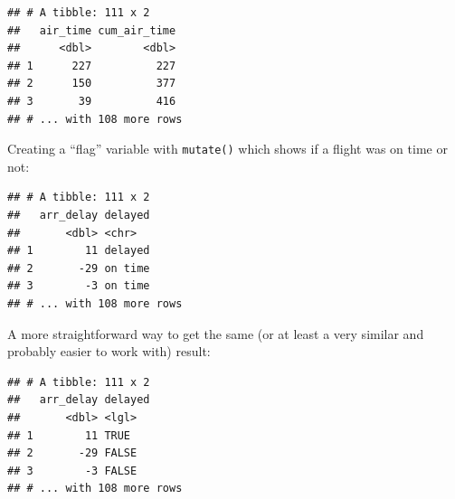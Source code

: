 \documentclass[]{book}
\newenvironment{Shaded}{}{}
\newcommand{\DataTypeTok}[1]{#1}
\newcommand{\DecValTok}[1]{#1}
\newcommand{\KeywordTok}[1]{\textcolor[rgb]{0.00,0.00,1.00}{#1}}
\newcommand{\NormalTok}[1]{#1}
\newcommand{\OperatorTok}[1]{#1}
\newcommand{\StringTok}[1]{\textcolor[rgb]{0.00,0.50,0.50}{#1}}
\begin{document}
\begin{verbatim}
## # A tibble: 111 x 2
##   air_time cum_air_time
##      <dbl>        <dbl>
## 1      227          227
## 2      150          377
## 3       39          416
## # ... with 108 more rows
\end{verbatim}

Creating a ``flag'' variable with \texttt{mutate()} which shows if a flight was on time or not:

\begin{Shaded}
\end{Shaded}

\begin{verbatim}
## # A tibble: 111 x 2
##   arr_delay delayed
##       <dbl> <chr>  
## 1        11 delayed
## 2       -29 on time
## 3        -3 on time
## # ... with 108 more rows
\end{verbatim}

A more straightforward way to get the same (or at least a very similar and probably easier to work with) result:

\begin{Shaded}
\end{Shaded}

\begin{verbatim}
## # A tibble: 111 x 2
##   arr_delay delayed
##       <dbl> <lgl>  
## 1        11 TRUE   
## 2       -29 FALSE  
## 3        -3 FALSE  
## # ... with 108 more rows
\end{verbatim}
\end{document}
